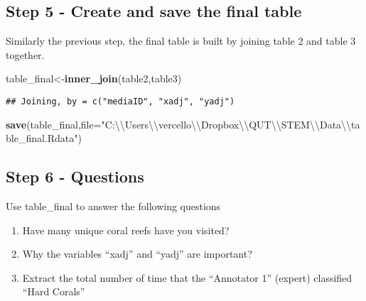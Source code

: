 \documentclass[]{article}
\newenvironment{Shaded}{\begin{snugshade}}{\end{snugshade}}
\newcommand{\KeywordTok}[1]{\textcolor[rgb]{0.13,0.29,0.53}{\textbf{#1}}}
\newcommand{\DataTypeTok}[1]{\textcolor[rgb]{0.13,0.29,0.53}{#1}}
\newcommand{\CharTok}[1]{\textcolor[rgb]{0.31,0.60,0.02}{#1}}
\newcommand{\StringTok}[1]{\textcolor[rgb]{0.31,0.60,0.02}{#1}}
\newcommand{\NormalTok}[1]{#1}
\providecommand{\tightlist}{%
  \setlength{\itemsep}{0pt}\setlength{\parskip}{0pt}}
\begin{document}
\subsection{Step 5 - Create and save the final
table}\label{step-5---create-and-save-the-final-table}

Similarly the previous step, the final table is built by joining table 2
and table 3 together.

\begin{Shaded}
\begin{Highlighting}[]
\NormalTok{table_final<-}\KeywordTok{inner_join}\NormalTok{(table2,table3)}
\end{Highlighting}
\end{Shaded}

\begin{verbatim}
## Joining, by = c("mediaID", "xadj", "yadj")
\end{verbatim}

\begin{Shaded}
\begin{Highlighting}[]
\KeywordTok{save}\NormalTok{(table_final,}\DataTypeTok{file=}\StringTok{"C:}\CharTok{\textbackslash{}\textbackslash{}}\StringTok{Users}\CharTok{\textbackslash{}\textbackslash{}}\StringTok{vercello}\CharTok{\textbackslash{}\textbackslash{}}\StringTok{Dropbox}\CharTok{\textbackslash{}\textbackslash{}}\StringTok{QUT}\CharTok{\textbackslash{}\textbackslash{}}\StringTok{STEM}\CharTok{\textbackslash{}\textbackslash{}}\StringTok{Data}\CharTok{\textbackslash{}\textbackslash{}}\StringTok{table_final.Rdata"}\NormalTok{)}
\end{Highlighting}
\end{Shaded}

\subsection{Step 6 - Questions}\label{step-6---questions}

Use table\_final to answer the following questions

\begin{enumerate}
\def\labelenumi{\arabic{enumi}.}
\tightlist
\item
  Have many unique coral reefs have you visited?\\
\item
  Why the variables ``xadj'' and ``yadj'' are important?
\item
  Extract the total number of time that the ``Annotator 1'' (expert)
  classified ``Hard Corals''
\end{enumerate}
\end{document}
